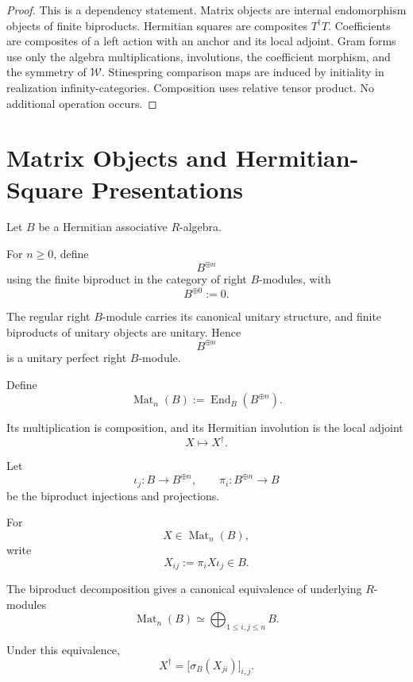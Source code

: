 \begin{proof}
This is a dependency statement. Matrix objects are internal endomorphism
objects of finite biproducts. Hermitian squares are composites
\(T^\dagger T\). Coefficients are composites of a left action with an anchor
and its local adjoint. Gram forms use only the algebra multiplications,
involutions, the coefficient morphism, and the symmetry of \(\mathcal W\).
Stinespring comparison maps are induced by initiality in realization
infinity-categories. Composition uses relative tensor product. No additional
operation occurs.
\end{proof}

\section{Matrix Objects and Hermitian-Square Presentations}
\label{sec:higher-stinespring-matrix-squares}

Let \(B\) be a Hermitian associative \(R\)-algebra.

For \(n\geq0\), define
\[
  B^{\oplus n}
\]
using the finite biproduct in the category of right \(B\)-modules, with
\[
  B^{\oplus0}:=0.
\]

The regular right \(B\)-module carries its canonical unitary structure, and
finite biproducts of unitary objects are unitary. Hence
\[
  B^{\oplus n}
\]
is a unitary perfect right \(B\)-module.

\begin{definition}
\label{def:higher-matrix-endomorphism-object}
Define
\[
  \operatorname{Mat}_n(B)
  :=
  \operatorname{End}_B(B^{\oplus n}).
\]

Its multiplication is composition, and its Hermitian involution is the local
adjoint
\[
  X\longmapsto X^\dagger.
\]
\end{definition}

Let
\[
  \iota_j:B\to B^{\oplus n},
  \qquad
  \pi_i:B^{\oplus n}\to B
\]
be the biproduct injections and projections.

For
\[
  X\in\operatorname{Mat}_n(B),
\]
write
\[
  X_{ij}
  :=
  \pi_iX\iota_j
  \in B.
\]

The biproduct decomposition gives a canonical equivalence of underlying
\(R\)-modules
\[
  \operatorname{Mat}_n(B)
  \simeq
  \bigoplus_{1\leq i,j\leq n}B.
\]

Under this equivalence,
\[
  X^\dagger
  =
  \bigl[\sigma_B(X_{ji})\bigr]_{i,j}.
\]


